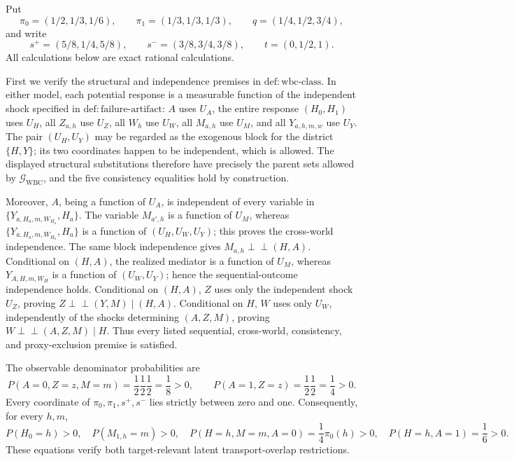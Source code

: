 Put
\[
 \pi _0=(1/2,1/3,1/6),\qquad \pi _1=(1/3,1/3,1/3),
 \qquad q=(1/4,1/2,3/4),
\]
and write
\[
 s^+=(5/8,1/4,5/8),\qquad s^-=(3/8,3/4,3/8),
 \qquad t=(0,1/2,1).
\]
All calculations below are exact rational calculations.

First we verify the structural and independence premises in
\(\mathrm{def{:}wbc\text{-}class}\).  In either model, each potential response is
a measurable function of the independent shock specified in
\(\mathrm{def{:}failure\text{-}artifact}\): \(A\) uses \(U_A\), the entire
response \((H_0,H_1)\) uses \(U_H\), all \(Z_{a,h}\) use \(U_Z\), all
\(W_h\) use \(U_W\), all \(M_{a,h}\) use \(U_M\), and all
\(Y_{a,h,m,w}\) use \(U_Y\).  The pair \((U_H,U_Y)\) may be regarded as
the exogenous block for the district \(\{H,Y\}\); its two coordinates happen
to be independent, which is allowed.  The displayed structural substitutions
therefore have precisely the parent sets allowed by
\(\mathcal G_{\mathrm{WBC}}\), and the five consistency equalities hold by
construction.

Moreover, \(A\), being a function of \(U_A\), is independent of every
variable in
\(\{Y_{a,H_a,m,W_{H_a}},H_a\}\).  The variable \(M_{a',h}\) is a
function of \(U_M\), whereas
\(\{Y_{a,H_a,m,W_{H_a}},H_a\}\) is a function of
\((U_H,U_W,U_Y)\); this proves the cross-world independence.  The same
block independence gives \(M_{a,h}\mathbin{\perp\!\!\!\perp}(H,A)\).
Conditional on \((H,A)\), the realized mediator is a function of \(U_M\),
whereas \(Y_{A,H,m,W_H}\) is a function of \((U_W,U_Y)\); hence the
sequential-outcome independence holds.  Conditional on \((H,A)\), \(Z\)
uses only the independent shock \(U_Z\), proving
\(Z\mathbin{\perp\!\!\!\perp}(Y,M)\mid(H,A)\).  Conditional on \(H\),
\(W\) uses only \(U_W\), independently of the shocks determining
\((A,Z,M)\), proving
\(W\mathbin{\perp\!\!\!\perp}(A,Z,M)\mid H\).  Thus every listed
sequential, cross-world, consistency, and proxy-exclusion premise is
satisfied.

The observable denominator probabilities are
\[
 P(A=0,Z=z,M=m)=\frac12\frac12\frac12=\frac18>0,
 \qquad
 P(A=1,Z=z)=\frac12\frac12=\frac14>0.
\]
Every coordinate of \(\pi _0,\pi _1,s^+,s^-\) lies strictly between zero
and one.  Consequently, for every \(h,m\),
\[
 P(H_0=h)>0,\quad P(M_{1,h}=m)>0,\quad
 P(H=h,M=m,A=0)=\frac14\pi _0(h)>0,\quad
 P(H=h,A=1)=\frac16>0.
\]
These equations verify both target-relevant latent transport-overlap
restrictions.

